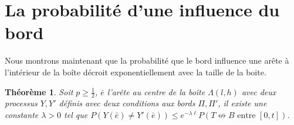 \documentclass[titlepage,a4paper,12pt]{article}
\newcounter{thm}
\newcounter{prop}
\newtheorem{cvg}[thm]{Théorème}
\newtheorem{tension}[prop]{Proposition}
\begin{document}
\begin{comment}
Nous étudions la constante $\gamma(p,t)$ et nous avons la proposition suivante:
\begin{tension}$\frac{\gamma(p,t)}{\gamma(p,0)} \rightarrow 1$ quand $p\rightarrow 1$.
\end{tension}
\begin{proof}
Nous utilisons le fait que $\lim_n \frac{1}{n}\ln P(O\longleftrightarrow n\mathbf{e}_1) = \lim_n \frac{1}{n}\ln P(O\longleftrightarrow \partial \Lambda_n)$ et nous considérons une boite de taille $n$. Nous remarquons le nombre d'arête qui se ferme entre $[0,t]$ est borné par une loi de Poisson de paramètre $n^2(1-p)t$. Nous notons $N$ le nombre de bout d'un space-time chemin, c'est-à-dire le nombre de chemins fermés tel que $$ (O,0) = (x_1,\theta_1) \longleftrightarrow (x_1,\theta_2) \longleftrightarrow (x_2,\theta_2)\dots \longleftrightarrow (x_N,\theta_N) \longleftrightarrow (\partial\Lambda_n,t).
$$
Nous avons donc $N$ est borné par une variable aléatoire de loi de Poisson de paramètre $n^2(1-p)t$. Quand $p\rightarrow 1$, nous pouvons rendre $N$ d'ordre de 1 avec une probabilité proche de 1 et nous avons le résultat.
\end{proof}
\end{comment}
\section{La probabilité d'une influence du bord}

Nous montrons maintenant que la probabilité que le bord influence une arête à l'intérieur de la boîte décroit exponentiellement avec la taille de la boite. 
\begin{cvg}
Soit $p\geqslant \frac{1}{2}$, $\bar{e}$ l'arête au centre de la boîte $\Lambda(l,h)$ avec deux processus $Y,Y'$ définis avec deux conditions aux bords $\Pi, \Pi'$, il existe une constante $\lambda> 0$ tel que $P(Y(\bar{e})\neq Y'(\bar{e})) \leqslant e^{-\lambda \ell} P(T\nleftrightarrow B \text{ entre }[0,t])$.
\end{cvg}
\end{document}
